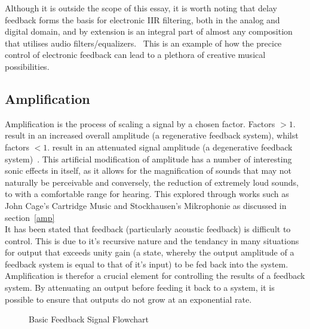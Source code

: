 \documentclass[titlepage]{scrartcl}
\begin{document}
    Although it is outside the scope of this essay, it is worth noting that
    delay feedback forms the basis for electronic IIR filtering, both in the
    analog and digital domain, and by extension is an integral part of almost
    any composition that utilises audio
    filters/equalizers.~\parencite[p.71-72]{zolzer2011dafx} This is an example
    of how the precice control of electronic feedback can lead to a plethora of
    creative musical possibilities.

    \subsection{Amplification}
    Amplification is the process of scaling a signal by a chosen factor.
    Factors $>1.$ result in an increased overall amplitude (a regenerative
    feedback system), whilst factors
    $<1.$ result in an attenuated signal amplitude (a degenerative feedback
    system)~\parencite[p.3-4]{kadis2012sosr}. 
    This artificial modification of amplitude has a number of interesting sonic
    effects in itself, as it allows for the magnification of sounds that may not
    naturally be perceivable and conversely, the reduction of extremely loud
    sounds, to with a comfortable range for hearing. This explored through
    works such as John Cage's Cartridge Music and Stockhausen's Mikrophonie as
    discussed in section~\ref{amp}\\

    It has been stated that feedback (particularly acoustic feedback) is
    difficult to control. This is due to it's recursive nature and the tendancy
    in many situations for output that exceeds unity gain (a state, whereby the
    output amplitude of a feedback system is equal to that of it's input) to be
    fed back into the system. Amplification is therefor a crucial element for
    controlling the results of a feedback system. By attenuating an output
    before feeding it back to a system, it is possible to ensure that outputs
    do not grow at an exponential rate.~\parencite[p.71-72]{zolzer2011dafx}
    \begin{figure}[H]
        \caption[Caption for LOF]{Basic Feedback Signal Flowchart\protect\footnotemark}
        \label{feed_flowchart}
    \end{figure}

\end{document}
